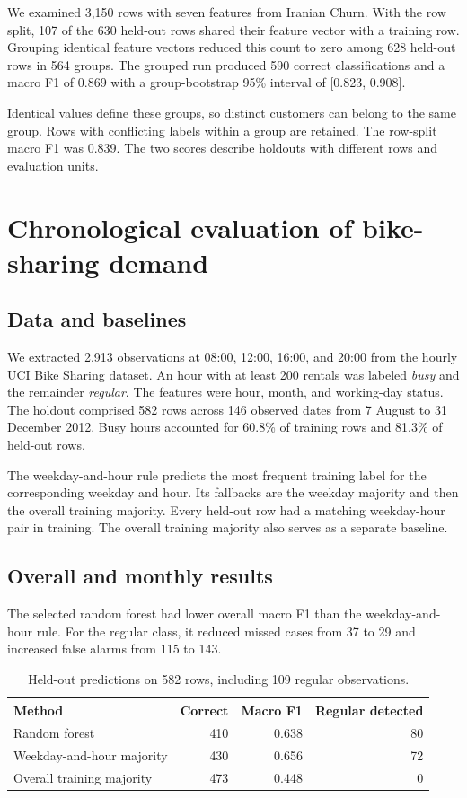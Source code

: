 \documentclass[10pt,a4paper]{article}
\begin{document}
We examined 3,150 rows with seven features from Iranian Churn. With the row split, 107 of the 630 held-out rows shared their feature vector with a training row. Grouping identical feature vectors reduced this count to zero among 628 held-out rows in 564 groups. The grouped run produced 590 correct classifications and a macro F1 of 0.869 with a group-bootstrap 95\% interval of [0.823, 0.908]. \cite{churn,milestone}

Identical values define these groups, so distinct customers can belong to the same group. Rows with conflicting labels within a group are retained. The row-split macro F1 was 0.839. The two scores describe holdouts with different rows and evaluation units.

\section{Chronological evaluation of bike-sharing demand}

\subsection{Data and baselines}

We extracted 2,913 observations at 08:00, 12:00, 16:00, and 20:00 from the hourly UCI Bike Sharing dataset. An hour with at least 200 rentals was labeled \emph{busy} and the remainder \emph{regular}. The features were hour, month, and working-day status. The holdout comprised 582 rows across 146 observed dates from 7 August to 31 December 2012. Busy hours accounted for 60.8\% of training rows and 81.3\% of held-out rows. \cite{milestone,bike}

The weekday-and-hour rule predicts the most frequent training label for the corresponding weekday and hour. Its fallbacks are the weekday majority and then the overall training majority. Every held-out row had a matching weekday-hour pair in training. The overall training majority also serves as a separate baseline. \cite{audit,milestone}

\subsection{Overall and monthly results}

The selected random forest had lower overall macro F1 than the weekday-and-hour rule. For the regular class, it reduced missed cases from 37 to 29 and increased false alarms from 115 to 143.

\begin{table}[H]
\centering
\caption{Held-out predictions on 582 rows, including 109 regular observations.}
\small
\begin{tabular}{lrrr}
\toprule
Method & Correct & Macro F1 & Regular detected \\
\midrule
Random forest & 410 & 0.638 & 80 \\
Weekday-and-hour majority & 430 & 0.656 & 72 \\
Overall training majority & 473 & 0.448 & 0 \\
\bottomrule
\end{tabular}
\end{table}
\end{document}
